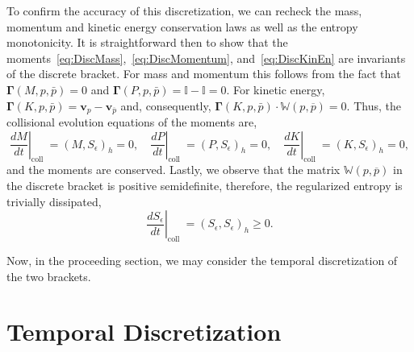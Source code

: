 \documentclass[preprint,12pt]{elsarticle}
\theoremstyle{definition}
\begin{document}
To confirm the accuracy of this discretization, we can recheck the mass, momentum and kinetic energy conservation laws as well as the entropy monotonicity. 
It is straightforward then to show that the moments~\eqref{eq:DiscMass},~\eqref{eq:DiscMomentum}, and~\eqref{eq:DiscKinEn} are invariants of the discrete bracket. For mass and momentum this follows from the fact that $\boldsymbol{\Gamma}\left(M, p, \bar{p}\right) = 0$ and $\boldsymbol{\Gamma}\left(P, p, \bar{p}\right) = \mathbb{I} - \mathbb{I} = 0$. For kinetic energy,  $\boldsymbol{\Gamma}\left(K, p, \bar{p}\right) = \boldsymbol{v}_p - \boldsymbol{v}_{\overline{p}}$ and, consequently, $\boldsymbol{\Gamma}\left(K, p, \bar{p}\right) \cdot \mathbb{W} (p, \overline{p})= 0$. Thus, the collisional evolution equations of the moments are,
\begin{equation*}
\left.\frac{d M}{d t}\right|_{\text {coll }} = (M, S_{\epsilon})_h= 0, \quad \left.\frac{d P}{d t}\right|_{\text {coll }} = (P, S_{\epsilon})_h= 0, \quad \left.\frac{d K}{d t}\right|_{\text {coll }} = (K, S_{\epsilon})_h= 0,
\end{equation*}
and the moments are conserved. Lastly, we observe that the matrix $\mathbb{W} (p, \overline{p})$ in the discrete bracket is positive semidefinite, therefore,
the regularized entropy is trivially dissipated,
\begin{equation}
\left.\frac{d S_{\epsilon}}{d t}\right|_{\text {coll }}=\left(S_{\epsilon}, S_{\epsilon}\right)_{h} \geq 0.
\end{equation}

Now, in the proceeding section, we may consider the temporal discretization of the two brackets.


\section{Temporal Discretization}\label{sec:TemporalDiscretization}
\end{document}
